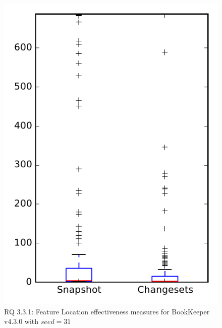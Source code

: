 
\begin{figure}
\centering
\includegraphics[height=0.4\textheight]{figures/flt_seed/rq1_bookkeeper_31}
\caption{RQ 3.3.1: Feature Location effectiveness measures for BookKeeper v4.3.0 with $seed=31$}
\label{fig:flt_seed:rq1:bookkeeper}
\end{figure}

